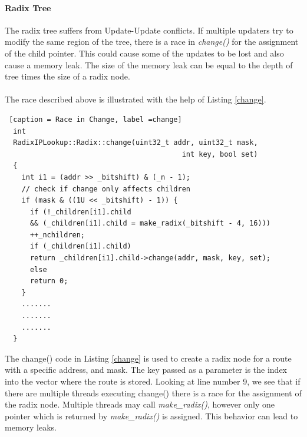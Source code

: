 \documentclass{article}
\begin{document}
\paragraph{Radix Tree}
The radix tree suffers from Update-Update conflicts. If multiple updaters try to modify the same region of the tree, there is a race in \emph{change()} for the assignment of the child pointer. This could cause some of the updates to be lost and also cause a memory leak. The size of the memory leak can be equal to the depth of tree times the size of a radix node.
\\\\The race described above is illustrated with the help of Listing \ref{change}.
\begin{lstlisting} [caption = Race in Change, label =change]
  int
  RadixIPLookup::Radix::change(uint32_t addr, uint32_t mask,
                                          int key, bool set)
  {
    int i1 = (addr >> _bitshift) & (_n - 1);
    // check if change only affects children
    if (mask & ((1U << _bitshift) - 1)) {
      if (!_children[i1].child
      && (_children[i1].child = make_radix(_bitshift - 4, 16)))
      ++_nchildren;
      if (_children[i1].child)
      return _children[i1].child->change(addr, mask, key, set);
      else
      return 0;
    }
    .......
    .......
    .......
  }
\end{lstlisting}
The change() code in Listing \ref{change} is used to create a radix node for a route with a specific address, and mask. The key passed as a parameter is the index into the vector where the route is stored. Looking at line number 9, we see that if there are multiple threads executing change() there is a race for the assignment of the radix node. Multiple threads may call \emph{make\_radix()}, however only one pointer which is returned by \emph{make\_radix()} is assigned. This behavior can lead to memory leaks.
\end{document}
